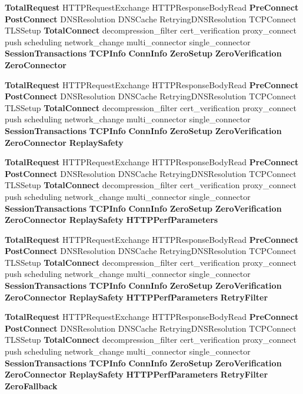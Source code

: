 \begin{DoxyCompactItemize}
\item 
{\bf Total\+Request} H\+T\+T\+P\+Request\+Exchange H\+T\+T\+P\+Response\+Body\+Read {\bf Pre\+Connect} {\bf Post\+Connect} D\+N\+S\+Resolution D\+N\+S\+Cache Retrying\+D\+N\+S\+Resolution T\+C\+P\+Connect T\+L\+S\+Setup {\bf Total\+Connect} decompression\+\_\+filter cert\+\_\+verification proxy\+\_\+connect push scheduling network\+\_\+change multi\+\_\+connector single\+\_\+connector {\bf Session\+Transactions} {\bf T\+C\+P\+Info} {\bf Conn\+Info} {\bf Zero\+Setup} {\bf Zero\+Verification} {\bf Zero\+Connector}
\item 
{\bf Total\+Request} H\+T\+T\+P\+Request\+Exchange H\+T\+T\+P\+Response\+Body\+Read {\bf Pre\+Connect} {\bf Post\+Connect} D\+N\+S\+Resolution D\+N\+S\+Cache Retrying\+D\+N\+S\+Resolution T\+C\+P\+Connect T\+L\+S\+Setup {\bf Total\+Connect} decompression\+\_\+filter cert\+\_\+verification proxy\+\_\+connect push scheduling network\+\_\+change multi\+\_\+connector single\+\_\+connector {\bf Session\+Transactions} {\bf T\+C\+P\+Info} {\bf Conn\+Info} {\bf Zero\+Setup} {\bf Zero\+Verification} {\bf Zero\+Connector} {\bf Replay\+Safety}
\item 
{\bf Total\+Request} H\+T\+T\+P\+Request\+Exchange H\+T\+T\+P\+Response\+Body\+Read {\bf Pre\+Connect} {\bf Post\+Connect} D\+N\+S\+Resolution D\+N\+S\+Cache Retrying\+D\+N\+S\+Resolution T\+C\+P\+Connect T\+L\+S\+Setup {\bf Total\+Connect} decompression\+\_\+filter cert\+\_\+verification proxy\+\_\+connect push scheduling network\+\_\+change multi\+\_\+connector single\+\_\+connector {\bf Session\+Transactions} {\bf T\+C\+P\+Info} {\bf Conn\+Info} {\bf Zero\+Setup} {\bf Zero\+Verification} {\bf Zero\+Connector} {\bf Replay\+Safety} {\bf H\+T\+T\+P\+Perf\+Parameters}
\item 
{\bf Total\+Request} H\+T\+T\+P\+Request\+Exchange H\+T\+T\+P\+Response\+Body\+Read {\bf Pre\+Connect} {\bf Post\+Connect} D\+N\+S\+Resolution D\+N\+S\+Cache Retrying\+D\+N\+S\+Resolution T\+C\+P\+Connect T\+L\+S\+Setup {\bf Total\+Connect} decompression\+\_\+filter cert\+\_\+verification proxy\+\_\+connect push scheduling network\+\_\+change multi\+\_\+connector single\+\_\+connector {\bf Session\+Transactions} {\bf T\+C\+P\+Info} {\bf Conn\+Info} {\bf Zero\+Setup} {\bf Zero\+Verification} {\bf Zero\+Connector} {\bf Replay\+Safety} {\bf H\+T\+T\+P\+Perf\+Parameters} {\bf Retry\+Filter}
\item 
{\bf Total\+Request} H\+T\+T\+P\+Request\+Exchange H\+T\+T\+P\+Response\+Body\+Read {\bf Pre\+Connect} {\bf Post\+Connect} D\+N\+S\+Resolution D\+N\+S\+Cache Retrying\+D\+N\+S\+Resolution T\+C\+P\+Connect T\+L\+S\+Setup {\bf Total\+Connect} decompression\+\_\+filter cert\+\_\+verification proxy\+\_\+connect push scheduling network\+\_\+change multi\+\_\+connector single\+\_\+connector {\bf Session\+Transactions} {\bf T\+C\+P\+Info} {\bf Conn\+Info} {\bf Zero\+Setup} {\bf Zero\+Verification} {\bf Zero\+Connector} {\bf Replay\+Safety} {\bf H\+T\+T\+P\+Perf\+Parameters} {\bf Retry\+Filter} {\bf Zero\+Fallback}

\end{DoxyCompactItemize}
